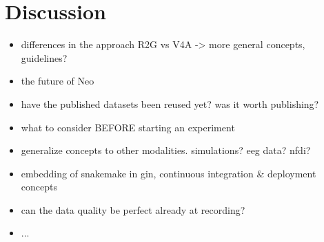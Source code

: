 \clearpage
\section{Discussion}
\label{sec:discussion}

\begin{itemize}
 \item differences in the approach R2G vs V4A -> more general concepts, guidelines?
 \item the future of Neo
 \item have the published datasets been reused yet? was it worth publishing?
 \item what to consider BEFORE starting an experiment
 \item generalize concepts to other modalities. simulations? eeg data? nfdi?
 \item embedding of snakemake in gin, continuous integration & deployment concepts
 \item can the data quality be perfect already at recording?
 \item ...
\end{itemize}



% 
% 
% 
